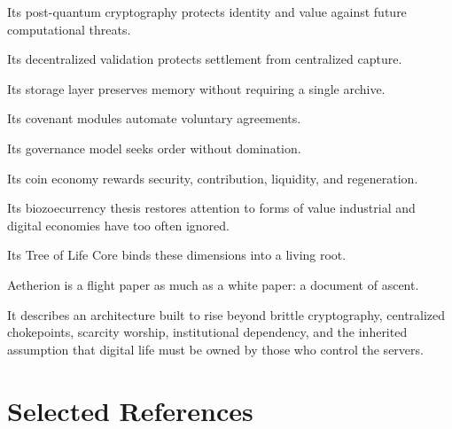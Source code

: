 ﻿\documentclass[12pt]{article}
\begin{document}
Its post-quantum cryptography protects identity and value against future computational threats.

Its decentralized validation protects settlement from centralized capture.

Its storage layer preserves memory without requiring a single archive.

Its covenant modules automate voluntary agreements.

Its governance model seeks order without domination.

Its coin economy rewards security, contribution, liquidity, and regeneration.

Its biozoecurrency thesis restores attention to forms of value industrial and digital economies have too often ignored.

Its Tree of Life Core binds these dimensions into a living root.

Aetherion is a flight paper as much as a white paper: a document of ascent.

It describes an architecture built to rise beyond brittle cryptography, centralized chokepoints, scarcity worship, institutional dependency, and the inherited assumption that digital life must be owned by those who control the servers.

\section{Selected References}
\end{document}
